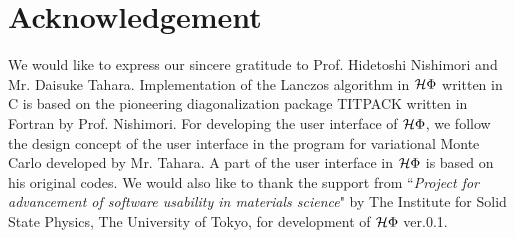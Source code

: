 \chapter{Acknowledgement}
We would like to express our sincere gratitude to Prof. Hidetoshi Nishimori and Mr. Daisuke Tahara.
Implementation of the Lanczos algorithm in $\mathcal{H} \Phi$ written in C is based on the
pioneering diagonalization package TITPACK written in Fortran by Prof. Nishimori.
For developing the user interface of $\mathcal{H} \Phi$, we follow the design concept of
the user interface in the program for variational Monte Carlo developed by Mr. Tahara.
A part of the user interface in $\mathcal{H} \Phi$ is based on his original codes.
We would also like to thank the support from ``{\it Project for advancement of software usability in materials science}" by The Institute for Solid State Physics,
The University of Tokyo, for development of $\mathcal{H} \Phi$ ver.0.1.
